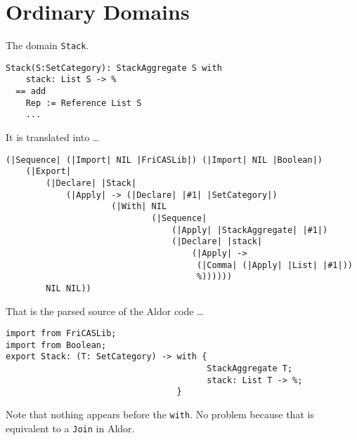 \documentclass{article}
\begin{document}
\section{Ordinary Domains}\label{sec:Domain}
The domain \verb'Stack'.
\begin{verbatim}
Stack(S:SetCategory): StackAggregate S with
    stack: List S -> %
  == add
    Rep := Reference List S
    ...
\end{verbatim}
It is translated into \ldots
\begin{verbatim}
(|Sequence| (|Import| NIL |FriCASLib|) (|Import| NIL |Boolean|)
    (|Export|
        (|Declare| |Stack|
            (|Apply| -> (|Declare| |#1| |SetCategory|)
                     (|With| NIL
                             (|Sequence|
                                 (|Apply| |StackAggregate| |#1|)
                                 (|Declare| |stack|
                                     (|Apply| ->
                                      (|Comma| (|Apply| |List| |#1|))
                                      %))))))
        NIL NIL))
\end{verbatim}
That is the parsed source of the Aldor code \ldots
\begin{verbatim}
import from FriCASLib;
import from Boolean;
export Stack: (T: SetCategory) -> with {
                                        StackAggregate T;
                                        stack: List T -> %;
                                  }
\end{verbatim}
Note that nothing appears before the \verb'with'. No problem because
that is equivalent to a \verb'Join' in Aldor.



















\end{document}
